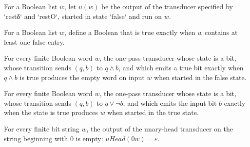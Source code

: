 \begin{definition}
\label{Complexity.BinArith.uRest}
\leanok
{}
For a Boolean list $w$, let $u(w)$ be the output of the transducer specified by `restδ`
and `restO`, started in state `false` and run on $w$.
\end{definition}

\begin{definition}
\label{Complexity.BinArith.hasFalse}
\leanok
For a Boolean list $w$, define a Boolean that is true exactly when $w$ contains at least
one false entry.
\end{definition}

\begin{theorem}
\label{Complexity.BinArith.transduce_head_false}
\leanok
{}
For every finite Boolean word $w$, the one-pass transducer whose state is a bit, whose
transition sends $(q,b)$ to $q \wedge b$, and which emits a true bit exactly when $q
\wedge b$ is true produces the empty word on input $w$ when started in the false state.
\end{theorem}

\begin{theorem}
\label{Complexity.BinArith.transduce_rest_true}
\leanok
{}
For every finite Boolean word $w$, the one-pass transducer whose state is a bit, whose
transition sends $(q,b)$ to $q \vee \neg b$, and which emits the input bit $b$ exactly
when the state is true produces $w$ when started in the true state.
\end{theorem}

\begin{theorem}
\label{Complexity.BinArith.uHead_false_cons}
\leanok
{}
For every finite bit string $w$, the output of the unary-head transducer on the string
beginning with $0$ is empty: $uHead(0w)=\varepsilon$.
\end{theorem}

